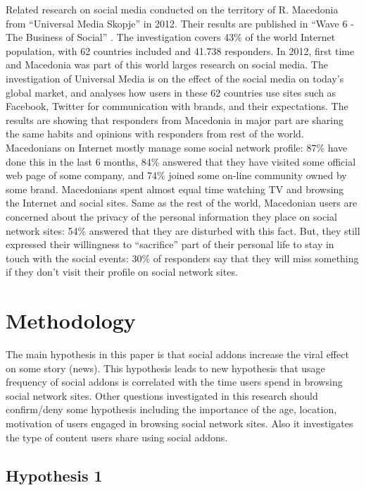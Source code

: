 \documentclass[conference]{IEEEtran}
\begin{document}
Related research on social media conducted on the territory of R. Macedonia from
``Universal Media Skopje'' \cite{universalMedia} in 2012. Their results
are published in ``Wave 6 - The Business of Social'' \cite{wave6}. The
investigation covers 43\% of the world Internet population, with 62 countries
included and 41.738 responders. In 2012, first time and Macedonia was part of
this world larges research on social media. The investigation of Universal Media
is on the effect of the social media on today's global market, and analyses how
users in these 62 countries use sites such as Facebook, Twitter for communication
with brands, and their expectations. The results are showing that responders
from Macedonia in major part are sharing the same habits and opinions with
responders from rest of the world. Macedonians on Internet mostly manage some
social network profile: 87\% have done this in the last 6 months, 84\% answered
that they have visited some official web page of some company, and 74\% joined
some on-line community owned by some brand. Macedonians spent almost equal time
watching TV and browsing the Internet and social sites. Same as the rest of the
world, Macedonian users are concerned about the privacy of the personal
information they place on social network sites: 54\% answered that they are
disturbed with this fact. But, they still expressed their willingness to
``sacrifice'' part of their personal life to stay in touch with the social
events: 30\% of responders say that they will miss something if they don't visit
their profile on social network sites.

\section{Methodology}

The main hypothesis in this paper is that social addons increase the viral
effect on some story (news). This hypothesis leads to new hypothesis that usage
frequency of social addons is correlated with the time users spend in browsing
social network sites. Other questions investigated in this research should
confirm/deny some hypothesis including the importance of the age, location,
motivation of users engaged in browsing social network sites. Also it
investigates the type of content users share using social addons.

\subsection{Hypothesis 1}
\end{document}
